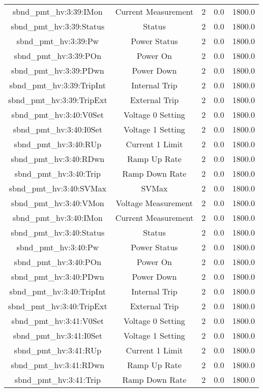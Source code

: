 \begin{table}[ptb]
\begin{tabular}{c | c c c c}
sbnd_pmt_hv:3:39:IMon & Current Measurement & 2 & 0.0 & 1800.0\\ 
sbnd_pmt_hv:3:39:Status & Status & 2 & 0.0 & 1800.0\\ 
sbnd_pmt_hv:3:39:Pw & Power Status & 2 & 0.0 & 1800.0\\ 
sbnd_pmt_hv:3:39:POn & Power On & 2 & 0.0 & 1800.0\\ 
sbnd_pmt_hv:3:39:PDwn & Power Down & 2 & 0.0 & 1800.0\\ 
sbnd_pmt_hv:3:39:TripInt & Internal Trip & 2 & 0.0 & 1800.0\\ 
sbnd_pmt_hv:3:39:TripExt & External Trip & 2 & 0.0 & 1800.0\\ 
sbnd_pmt_hv:3:40:V0Set & Voltage 0 Setting & 2 & 0.0 & 1800.0\\ 
sbnd_pmt_hv:3:40:I0Set & Voltage 1 Setting & 2 & 0.0 & 1800.0\\ 
sbnd_pmt_hv:3:40:RUp & Current 1 Limit & 2 & 0.0 & 1800.0\\ 
sbnd_pmt_hv:3:40:RDwn & Ramp Up Rate & 2 & 0.0 & 1800.0\\ 
sbnd_pmt_hv:3:40:Trip & Ramp Down Rate & 2 & 0.0 & 1800.0\\ 
sbnd_pmt_hv:3:40:SVMax & SVMax & 2 & 0.0 & 1800.0\\ 
sbnd_pmt_hv:3:40:VMon & Voltage Measurement & 2 & 0.0 & 1800.0\\ 
sbnd_pmt_hv:3:40:IMon & Current Measurement & 2 & 0.0 & 1800.0\\ 
sbnd_pmt_hv:3:40:Status & Status & 2 & 0.0 & 1800.0\\ 
sbnd_pmt_hv:3:40:Pw & Power Status & 2 & 0.0 & 1800.0\\ 
sbnd_pmt_hv:3:40:POn & Power On & 2 & 0.0 & 1800.0\\ 
sbnd_pmt_hv:3:40:PDwn & Power Down & 2 & 0.0 & 1800.0\\ 
sbnd_pmt_hv:3:40:TripInt & Internal Trip & 2 & 0.0 & 1800.0\\ 
sbnd_pmt_hv:3:40:TripExt & External Trip & 2 & 0.0 & 1800.0\\ 
sbnd_pmt_hv:3:41:V0Set & Voltage 0 Setting & 2 & 0.0 & 1800.0\\ 
sbnd_pmt_hv:3:41:I0Set & Voltage 1 Setting & 2 & 0.0 & 1800.0\\ 
sbnd_pmt_hv:3:41:RUp & Current 1 Limit & 2 & 0.0 & 1800.0\\ 
sbnd_pmt_hv:3:41:RDwn & Ramp Up Rate & 2 & 0.0 & 1800.0\\ 
sbnd_pmt_hv:3:41:Trip & Ramp Down Rate & 2 & 0.0 & 1800.0\\ 

\end{tabular}
\end{table}
